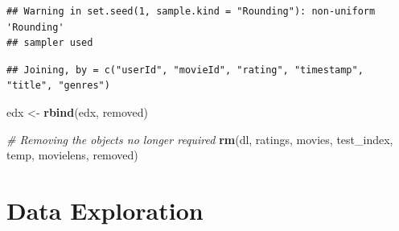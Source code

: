 \documentclass[]{article}
\newenvironment{Shaded}{\begin{snugshade}}{\end{snugshade}}
\newcommand{\CommentTok}[1]{\textcolor[rgb]{0.56,0.35,0.01}{\textit{#1}}}
\newcommand{\DataTypeTok}[1]{\textcolor[rgb]{0.13,0.29,0.53}{#1}}
\newcommand{\DecValTok}[1]{\textcolor[rgb]{0.00,0.00,0.81}{#1}}
\newcommand{\FloatTok}[1]{\textcolor[rgb]{0.00,0.00,0.81}{#1}}
\newcommand{\KeywordTok}[1]{\textcolor[rgb]{0.13,0.29,0.53}{\textbf{#1}}}
\newcommand{\NormalTok}[1]{#1}
\newcommand{\OperatorTok}[1]{\textcolor[rgb]{0.81,0.36,0.00}{\textbf{#1}}}
\newcommand{\OtherTok}[1]{\textcolor[rgb]{0.56,0.35,0.01}{#1}}
\newcommand{\StringTok}[1]{\textcolor[rgb]{0.31,0.60,0.02}{#1}}
\begin{document}
\begin{verbatim}
## Warning in set.seed(1, sample.kind = "Rounding"): non-uniform 'Rounding'
## sampler used
\end{verbatim}

\begin{Shaded}
\end{Shaded}

\begin{verbatim}
## Joining, by = c("userId", "movieId", "rating", "timestamp", "title", "genres")
\end{verbatim}

\begin{Shaded}
\begin{Highlighting}[]
\NormalTok{ edx <-}\StringTok{ }\KeywordTok{rbind}\NormalTok{(edx, removed)}

 \CommentTok{# Removing the objects no longer required}
\KeywordTok{rm}\NormalTok{(dl, ratings, movies, test_index, temp, movielens, removed)}
\end{Highlighting}
\end{Shaded}

\section{Data Exploration}
\label{sec:dataanalysis}
\end{document}
